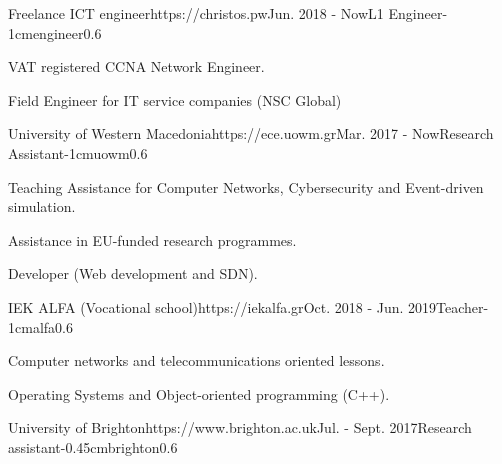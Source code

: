 \documentclass{mycv}
\begin{document}
	\vspace*{0.5cm}
	
	\begin{EntryDatedLogo}{Freelance ICT engineer}{https://christos.pw}{Jun. 2018 - Now}{L1 Engineer}{-1cm}{engineer}{0.6}
		\begin{Itemize}
			\item VAT registered CCNA Network Engineer.
			\item Field Engineer for IT service companies (NSC Global)
		\end{Itemize}
	\end{EntryDatedLogo}

	\vspace*{0.5cm}	

	\begin{EntryDatedLogo}{University of Western Macedonia}{https://ece.uowm.gr}{Mar. 2017 - Now}{Research Assistant}{-1cm}{uowm}{0.6}
		\begin{Itemize}
			\item Teaching Assistance for Computer Networks, Cybersecurity and Event-driven simulation.
			\item Assistance in EU-funded research programmes.
			\item Developer (Web development and SDN). 
		\end{Itemize}
	\end{EntryDatedLogo}

	\vspace*{0.5cm}

	\begin{EntryDatedLogo}{IEK ALFA (Vocational school)}{https://iekalfa.gr}{Oct. 2018 - Jun. 2019}{Teacher}{-1cm}{alfa}{0.6}
		\begin{Itemize}
			\item Computer networks and telecommunications oriented lessons.
			\item Operating Systems and Object-oriented programming (C++).
		\end{Itemize}
	\end{EntryDatedLogo}

	\vspace*{0.5cm}
		
	\begin{EntryDatedLogo}{University of Brighton}{https://www.brighton.ac.uk}{Jul. - Sept. 2017}{Research assistant}{-0.45cm}{brighton}{0.6}
	\end{EntryDatedLogo}
\end{document}
